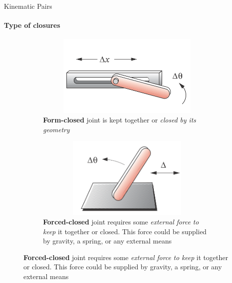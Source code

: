 \documentclass[aspectratio=169]{beamer}
\begin{document}
\begin{frame}[t]{Kinematic Pairs}
\framesubtitle{Type of closures}
\vspace{-0.5cm}
    \begin{figure}[H]
        \begin{subfigure}[t]{0.49\textwidth}
            \centering\includegraphics[height=4cm,width=1\textwidth,keepaspectratio]{RP_form_closed.png}
            \caption*{\textbf{Form-closed} joint is kept together or \textit{closed by its geometry}}
            \label{fig:RP_form_closed.png}
        \end{subfigure}
        \begin{subfigure}[t]{0.49\textwidth}
            \centering\includegraphics[height=4cm,width=1\textwidth,keepaspectratio]{RP_force_closed.png}
            \caption*{\textbf{Forced-closed} joint requires some \textit{external force to keep} it together or closed.  This force could be supplied by gravity, a spring, or any external means}
            \label{fig:RP_force_closed.png}
        \end{subfigure}
    \end{figure}
\end{frame}
\end{document}

